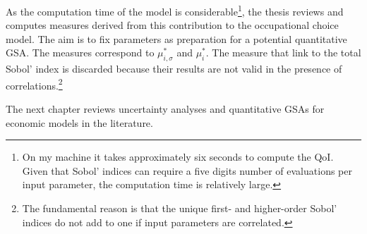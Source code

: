 \noindent
As the computation time of the \cite{Keane.1994} model is considerable\footnote{On my machine it takes approximately six seconds to compute the QoI. Given that Sobol' indices can require a five digits number of evaluations per input parameter, the computation time is relatively large.}, the thesis reviews \cite{ge2017extending} and computes measures derived from this contribution to the occupational choice model. The aim is to fix parameters as preparation for a potential quantitative GSA. The measures correspond to $\mu_{i,\sigma}^*$ and $\mu_{i}^*$. The measure that \cite{kucherenko2009derivative} link to the total Sobol' index is discarded because their results are not valid in the presence of correlations.\footnote{The fundamental reason is that the unique first- and higher-order Sobol' indices do not add to one if input parameters are correlated.}

The next chapter reviews uncertainty analyses and quantitative GSAs for economic models in the literature. 
